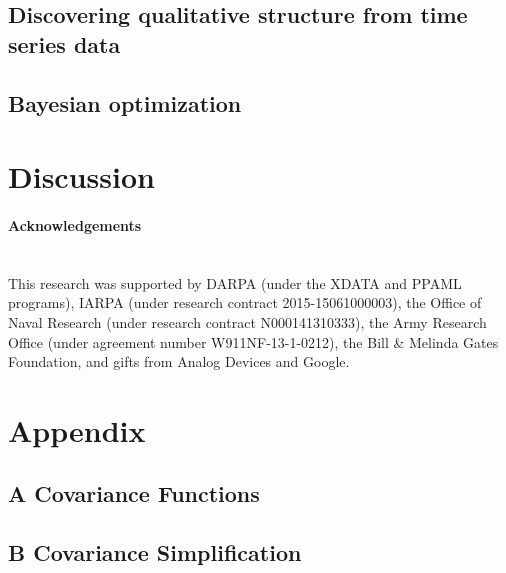 \documentclass[twoside,11pt]{article}
\newcommand{\gpmem}{\texttt{gpmem}}
\newcommand{\myparagraph}[1]{\paragraph{#1}\mbox{}\\}
\begin{document}
\subsection{Discovering qualitative structure from time series data}\label{sec:structurelearning}


\subsection{Bayesian optimization}

\label{sec:thompson}




%
%
%
\section{Discussion}

\myparagraph{Acknowledgements}
This research was supported by DARPA
  (under the XDATA and PPAML programs), IARPA (under research contract
  2015-15061000003), the Office of Naval Research (under research
  contract N000141310333), the Army Research Office (under agreement
  number W911NF-13-1-0212), the Bill \& Melinda Gates Foundation, and
  gifts from Analog Devices and Google.
\newpage
\section*{Appendix}
\subsection*{A Covariance Functions}


\subsection*{B Covariance Simplification}

\end{document}
